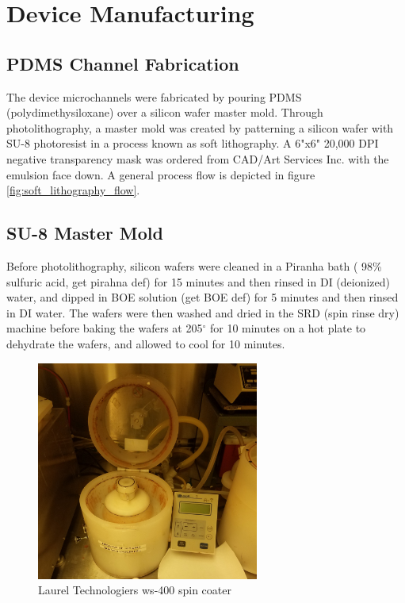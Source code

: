 
\section{Device Manufacturing}

\subsection{PDMS Channel Fabrication}
\par The device microchannels were fabricated by pouring PDMS (polydimethysiloxane) over a silicon wafer master mold. Through photolithography, a master mold was created by patterning a silicon wafer with SU-8 photoresist in  a process known as soft lithography. A 6"x6" 20,000 DPI negative transparency mask was ordered from CAD/Art Services Inc. with the emulsion face down. A general process flow is depicted in figure \ref{fig:soft_lithography_flow}.


\subsection*{SU-8 Master Mold}

\par Before photolithography, silicon wafers were cleaned in a Piranha bath ( 98\% sulfuric acid, get pirahna def) for 15 minutes and then rinsed in DI (deionized) water, and dipped in BOE solution (get BOE def) for 5 minutes and then rinsed in DI water. The wafers were then washed and dried in the SRD (spin rinse dry) machine before baking the wafers at 205$^\circ$ for 10 minutes on a hot plate to dehydrate the wafers, and allowed to cool for 10 minutes. 

\begin{figure}[h]
    \centering
    \includegraphics[angle=-90,origin=c,width=0.65\textwidth]{images/resist_spinner_open.jpg}
    \caption{Laurel Technologiers ws-400 spin coater}
    \label{fig:spin_coater}
\end{figure}

